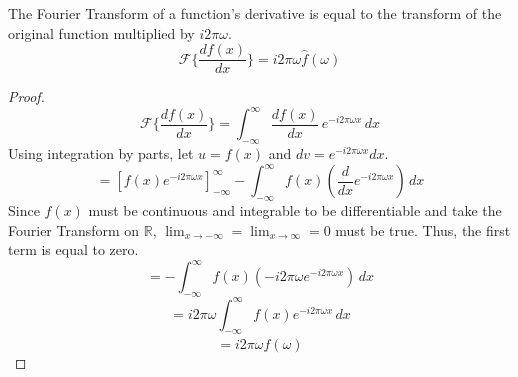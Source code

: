 \begin{theorem}
    \label{fourier_derivative}
    The Fourier Transform of a function's derivative is equal to the transform of the original function multiplied by $i 2\pi \omega$.
    \[ \mathcal{F}\{ \frac{d f(x)}{dx} \} = i 2\pi \omega \hat{f}(\omega) \]
\end{theorem}

\begin{proof}
    \[ \mathcal{F}\{ \frac{d f(x)}{dx} \} = \int_{-\infty}^{\infty} \frac{d f(x)}{dx}  \, e^{-i 2\pi \omega x} \,dx \]
    Using integration by parts, let \(u = f(x)\) and \(dv = e^{-i 2\pi \omega x} dx\).
    \[ = \left[ f(x) e^{-i 2\pi \omega x} \right]_{-\infty}^{\infty} - \int_{-\infty}^{\infty} f(x) \left( \frac{d}{dx} e^{-i 2\pi \omega x} \right) \,dx \]
    Since \(f(x)\) must be continuous and integrable to be differentiable and take the Fourier Transform on \(\mathbb{R}\), \(\lim_{x \to -\infty}=\lim_{x \to \infty}=0\) must be true. Thus, the first term is equal to zero. 
    \[ = - \int_{-\infty}^{\infty} f(x) \left( -i 2\pi \omega e^{-i 2\pi \omega x} \right) \,dx \]
    \[ = i 2\pi \omega \int_{-\infty}^{\infty} f(x) e^{-i 2\pi \omega x} \,dx \]
    \[ = i 2\pi \omega \hat{f}(\omega) \]
\end{proof}
